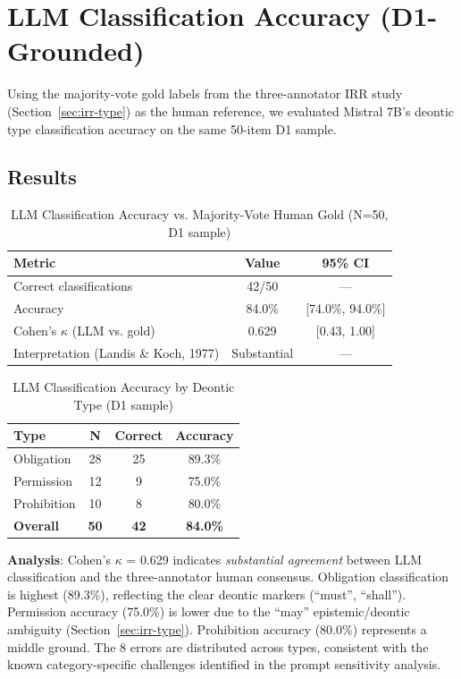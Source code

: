 \section{LLM Classification Accuracy (D1-Grounded)}
\label{sec:intra-annotator}

Using the majority-vote gold labels from the three-annotator IRR study (Section~\ref{sec:irr-type}) as the human reference, we evaluated Mistral 7B's deontic type classification accuracy on the same 50-item D1 sample.

\subsection{Results}

\begin{table}[htbp]
\centering
\caption{LLM Classification Accuracy vs. Majority-Vote Human Gold (N=50, D1 sample)}
\label{tab:llm-accuracy-d3}
\begin{tabular}{lcc}
\toprule
\textbf{Metric} & \textbf{Value} & \textbf{95\% CI} \\
\midrule
Correct classifications & 42/50 & --- \\
Accuracy & 84.0\% & [74.0\%, 94.0\%] \\
Cohen's $\kappa$ (LLM vs. gold) & 0.629 & [0.43, 1.00] \\
Interpretation (Landis \& Koch, 1977) & Substantial & --- \\
\bottomrule
\end{tabular}
\end{table}

\begin{table}[htbp]
\centering
\caption{LLM Classification Accuracy by Deontic Type (D1 sample)}
\label{tab:llm-accuracy-by-type}
\begin{tabular}{lccc}
\toprule
\textbf{Type} & \textbf{N} & \textbf{Correct} & \textbf{Accuracy} \\
\midrule
Obligation  & 28 & 25 & 89.3\% \\
Permission  & 12 & 9  & 75.0\% \\
Prohibition & 10 & 8  & 80.0\% \\
\midrule
\textbf{Overall} & \textbf{50} & \textbf{42} & \textbf{84.0\%} \\
\bottomrule
\end{tabular}
\end{table}

\textbf{Analysis}: Cohen's $\kappa$ = 0.629 indicates \textit{substantial agreement} between LLM classification and the three-annotator human consensus. Obligation classification is highest (89.3\%), reflecting the clear deontic markers (``must'', ``shall''). Permission accuracy (75.0\%) is lower due to the ``may'' epistemic/deontic ambiguity (Section~\ref{sec:irr-type}). Prohibition accuracy (80.0\%) represents a middle ground. The 8 errors are distributed across types, consistent with the known category-specific challenges identified in the prompt sensitivity analysis.

